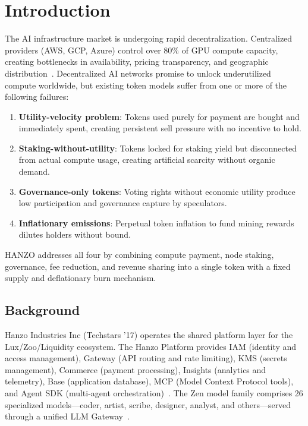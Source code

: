 \section{Introduction}

\label{sec:intro}

The AI infrastructure market is undergoing rapid decentralization. Centralized
providers (AWS, GCP, Azure) control over 80\% of GPU compute capacity, creating
bottlenecks in availability, pricing transparency, and geographic
distribution~\cite{mckinseyai2024}. Decentralized AI networks promise to unlock
underutilized compute worldwide, but existing token models suffer from one or more
of the following failures:

\begin{enumerate}[leftmargin=1.4em]
    \item \textbf{Utility-velocity problem}: Tokens used purely for payment are
    bought and immediately spent, creating persistent sell pressure with no
    incentive to hold.
    \item \textbf{Staking-without-utility}: Tokens locked for staking yield but
    disconnected from actual compute usage, creating artificial scarcity without
    organic demand.
    \item \textbf{Governance-only tokens}: Voting rights without economic utility
    produce low participation and governance capture by speculators.
    \item \textbf{Inflationary emissions}: Perpetual token inflation to fund
    mining rewards dilutes holders without bound.
\end{enumerate}

HANZO addresses all four by combining compute payment, node staking, governance,
fee reduction, and revenue sharing into a single token with a fixed supply and
deflationary burn mechanism.

\subsection{Background}

Hanzo Industries Inc (Techstars '17) operates the shared platform layer for the
Lux/Zoo/Liquidity ecosystem. The Hanzo Platform provides IAM (identity and access
management), Gateway (API routing and rate limiting), KMS (secrets management),
Commerce (payment processing), Insights (analytics and telemetry), Base
(application database), MCP (Model Context Protocol tools), and Agent SDK
(multi-agent orchestration)~\cite{hanzoplatform}. The Zen model family comprises
26 specialized models---coder, artist, scribe, designer, analyst, and
others---served through a unified LLM Gateway~\cite{hanzollmgateway}.

